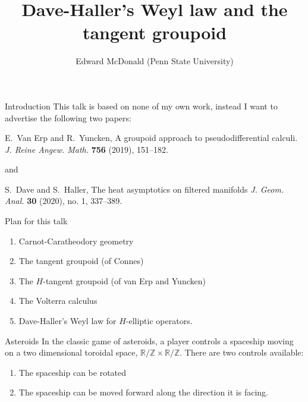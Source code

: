 \documentclass{beamer}
\newcommand\makebeamertitle{\frame{\maketitle}}%
\numberwithin{equation}{section}
\theoremstyle{plain}
\theoremstyle{plain}
\theoremstyle{definition}
\theoremstyle{plain}
\theoremstyle{plain}
\theoremstyle{definition}
\newcommand{\Rl}{\mathbb{R}}
\newcommand{\Itgr}{\mathbb{Z}}
\begin{document}
\title[Weyl law and the tangent groupoid]{Dave-Haller's Weyl law and the tangent groupoid}


\author[E. McDonald]{Edward McDonald (Penn State University)}



\makebeamertitle


\begin{frame}{Introduction}
  This talk is based on none of my own work, instead I want to advertise the following two papers:
  \begin{center}
    E.~Van Erp and R.~Yuncken, A groupoid approach to pseudodifferential calculi. \emph{J. Reine Angew. Math.} \textbf{756} (2019), 151--182.
  \end{center}
  and
  \begin{center}
    S.~Dave and S.~Haller, The heat asymptotics on filtered manifolds \emph{J. Geom. Anal.} \textbf{30} (2020), no. 1, 337--389.
  \end{center}
\end{frame}

\begin{frame}{Plan for this talk}
    \begin{enumerate}
        \item{} Carnot-Caratheodory geometry
        \item{} The tangent groupoid (of Connes)
        \item{} The $H$-tangent groupoid (of van Erp and Yuncken)
        \item{} The Volterra calculus
        \item{} Dave-Haller's Weyl law for $H$-elliptic operators.
    \end{enumerate}
\end{frame}

\begin{frame}{Asteroids}
  In the classic game of asteroids, a player controls a spaceship moving on a two dimensional toroidal space, $\Rl/\Itgr\times \Rl/\Itgr.$ There are two controls available:
  \begin{enumerate}[{\rm (i)}]
    \item{} The spaceship can be rotated
    \item{} The spaceship can be moved forward along the direction it is facing.
  \end{enumerate}
\end{frame}
\end{document}
